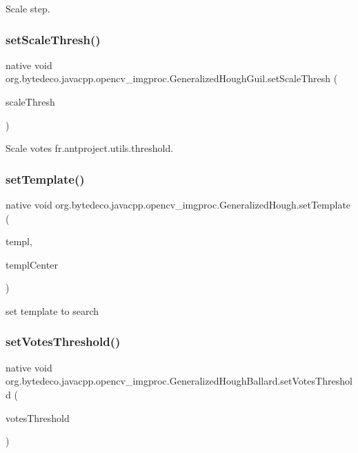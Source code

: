 Scale step. \mbox{\label{group__imgproc_ga09e4c27dd4351588315bc5b3fe754a7f}} 
\subsubsection{\texorpdfstring{set\+Scale\+Thresh()}{setScaleThresh()}}
{\footnotesize\ttfamily native void org.\+bytedeco.\+javacpp.\+opencv\+\_\+imgproc.\+Generalized\+Hough\+Guil.\+set\+Scale\+Thresh (\begin{DoxyParamCaption}\item[{int}]{scale\+Thresh }\end{DoxyParamCaption})}

Scale votes fr.antproject.utils.threshold. \mbox{\label{group__imgproc_ga16cb031da52c3fe55c8196bca11a72f3}}
\subsubsection{\texorpdfstring{set\+Template()}{setTemplate()}}
{\footnotesize\ttfamily native void org.\+bytedeco.\+javacpp.\+opencv\+\_\+imgproc.\+Generalized\+Hough.\+set\+Template (\begin{DoxyParamCaption}\item[{@By\+Val Mat}]{templ,  }\item[{@By\+Val(null\+Value=\char`\"{}cv\+::\+fr.antproject.utils.Point(-\/1, -\/1)\char`\"{}) fr.antproject.utils.Point}]{templ\+Center }\end{DoxyParamCaption})}

set template to search \mbox{\label{group__imgproc_ga25a1e73a7d5ff7fe78971cb34fd6706c}} 
\subsubsection{\texorpdfstring{set\+Votes\+Threshold()}{setVotesThreshold()}}
{\footnotesize\ttfamily native void org.\+bytedeco.\+javacpp.\+opencv\+\_\+imgproc.\+Generalized\+Hough\+Ballard.\+set\+Votes\+Threshold (\begin{DoxyParamCaption}\item[{int}]{votes\+Threshold }\end{DoxyParamCaption})}

